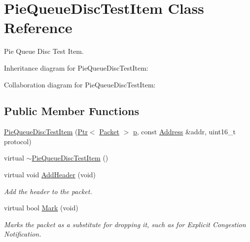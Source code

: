 \hypertarget{classPieQueueDiscTestItem}{}\section{Pie\+Queue\+Disc\+Test\+Item Class Reference}
\label{classPieQueueDiscTestItem}


Pie Queue Disc Test Item.  




Inheritance diagram for Pie\+Queue\+Disc\+Test\+Item\+:


Collaboration diagram for Pie\+Queue\+Disc\+Test\+Item\+:
\subsection*{Public Member Functions}
\begin{DoxyCompactItemize}
\item 
\hyperlink{classPieQueueDiscTestItem_a8e7d9eae49bdea2ed5d8688eea7d6114}{Pie\+Queue\+Disc\+Test\+Item} (\hyperlink{classns3_1_1Ptr}{Ptr}$<$ \hyperlink{classns3_1_1Packet}{Packet} $>$ \hyperlink{lte__link__budget__x2__handover__measures_8m_ac9de518908a968428863f829398a4e62}{p}, const \hyperlink{classns3_1_1Address}{Address} \&addr, uint16\+\_\+t protocol)
\item 
virtual \hyperlink{classPieQueueDiscTestItem_afd180ec8f671dea619967b65a173771f}{$\sim$\+Pie\+Queue\+Disc\+Test\+Item} ()
\item 
virtual void \hyperlink{classPieQueueDiscTestItem_ad8aa475026eafcb7cf0a0e2f49d47a8d}{Add\+Header} (void)
\begin{DoxyCompactList}\small\item\em Add the header to the packet. \end{DoxyCompactList}\item 
virtual bool \hyperlink{classPieQueueDiscTestItem_a134acbce6e0150f427ac8fe00e09337e}{Mark} (void)
\begin{DoxyCompactList}\small\item\em Marks the packet as a substitute for dropping it, such as for Explicit Congestion Notification. \end{DoxyCompactList}\end{DoxyCompactItemize}
